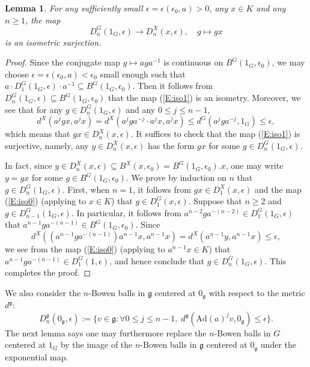 \documentclass[reqno,12pt]{amsart}
\newtheorem{lemma}[theorem]{Lemma}
\theoremstyle{definition}
\numberwithin{equation}{section}
\newcommand{\Ad}{\mathrm{Ad}}
\newcommand{\Lg}{\mathfrak{g}}
\begin{document}
{\begin{lemma}
    For any sufficiently small $\epsilon=\epsilon(\epsilon_0,a)>0$, any $x\in K$ and any $n\geq 1$, the map \begin{equation}\label{E:iso1}
    D^G_n(1_G,\epsilon)\to D^X_n(x,\epsilon),\quad g\mapsto gx\end{equation} is an isometric surjection.
\end{lemma}
\begin{proof}
    Since the conjugate map $g\mapsto aga^{-1}$ is continuous on $B^G(1_G,\epsilon_0)$, we may choose $\epsilon=\epsilon(\epsilon_0,a)<\epsilon_0$ small enough such that $a\cdot D_1^G(1_G,\epsilon)\cdot a^{-1}\subseteq B^G(1_G,\epsilon_0)$. Then it follows from $D^G_n(1_G,\epsilon)\subseteq B^G(1_G,\epsilon_0)$ that the map (\ref{E:iso1}) is an isometry. Moreover, we see that for any $g\in D^G_n(1_G,\epsilon)$ and any $0\leq j\leq n-1$, $$
    d^X(a^jgx,a^jx)=d^X(a^jga^{-j}\cdot a^jx,a^jx)\leq d^G(a^jga^{-j},1_G)\leq \epsilon,
    $$ which means that $gx\in D^X_n(x,\epsilon)$. It suffices to check that the map (\ref{E:iso1}) is surjective, namely, any $y\in D^X_n(x,\epsilon)$ has the form $gx$ for some $g\in D^G_n(1_G,\epsilon)$.

    In fact, since $y\in D^X_n(x,\epsilon)\subseteq B^X(x,\epsilon_0)=B^G(1_G,\epsilon_0).x$, one may write $y=gx$ for some $g\in B^G(1_G,\epsilon_0)$. We prove by induction on $n$ that $g\in D^G_n(1_G,\epsilon)$. First, when $n=1$, it follows from $gx\in D_1^X(x,\epsilon)$ and the map (\ref{E:iso0}) (applying to $x\in K$) that $g\in D^G_1(x,\epsilon)$. Suppose that $n\geq 2$ and $g\in D^G_{n-1}(1_G,\epsilon)$. In particular, it follows from $a^{n-2}ga^{-(n-2)}\in D^G_1(1_G,\epsilon)$ that $a^{n-1}ga^{-(n-1)}\in B^G(1_G,\epsilon_0)$. Since $$
    d^X((a^{n-1}ga^{-(n-1)})a^{n-1}x,a^{n-1}x)=d^X(a^{n-1}y,a^{n-1}x)\leq\epsilon,
    $$
    we see from the map (\ref{E:iso0}) (applying to $a^{n-1}x\in K$) that $a^{n-1}ga^{-(n-1)}\in D^G_1(1,\epsilon)$, and hence conclude that $g\in D^G_n(1_G,\epsilon)$. This completes the proof.
\end{proof}

We also consider the $n$-Bowen balls in $\Lg$ centered at $0_\Lg$ with respect to the metric $d^\Lg$:
$$D^\Lg_n(0_\Lg,\epsilon):=\{v\in \Lg:\forall 0\leq j\leq n-1,\;d^\Lg(\Ad(a)^jv,0_\Lg)\leq \epsilon\}.$$ The next lemma says one may furthermore replace the $n$-Bowen balls in $G$ centered at $1_G$ by the image of the $n$-Bowen balls in $\mathfrak{g}$ centered at $0_\Lg$ under the exponential map.

}
\end{document}

